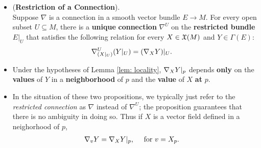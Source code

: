 \documentclass[11pt]{article}
\begin{document}
\begin{itemize}
\item \begin{proposition} (\textbf{Restriction of a Connection}).\citep{lee2018introduction} \\
Suppose $\nabla$ is a connection in a smooth vector bundle  $E \rightarrow M$. For every open subset $U \subseteq M$, there is a \textbf{unique} \textbf{connection} $\nabla^{U}$ on the \textbf{restricted bundle} $E|_{U}$ that satisfies the following relation for every $X \in {\mathfrak X}(M)$ and $Y\in \Gamma(E)$:
\begin{align}
\nabla^U_{(X|_{U})}(Y|_{U}) &= (\nabla_{X}{Y})|_{U}.  \label{eqn: connection_restriction}
\end{align}
\end{proposition}

\item \begin{proposition}
Under the hypotheses of Lemma \ref{lem: locality}, $\nabla_{X}{Y}|_{p}$ depends \textbf{only} on the \textbf{values} of $Y$ in a \textbf{neighborhood} of $p$ and the \textbf{value} of $X$ \textbf{at} $p$.
\end{proposition}

\item \begin{remark}
In the situation of these two propositions, we typically just refer to the \emph{restricted connection} as $\nabla$ instead of $\nabla^U$; the proposition guarantees that there is no ambiguity in doing so. Thus if $X$ is a vector field defined in a neighorhood of $p$, 
\begin{align*}
\nabla_{v}{Y} &= \nabla_{X}{Y}|_{p}, \quad \text{ for }v = X_p.
\end{align*}
\end{remark}
\end{itemize}
\end{document}
